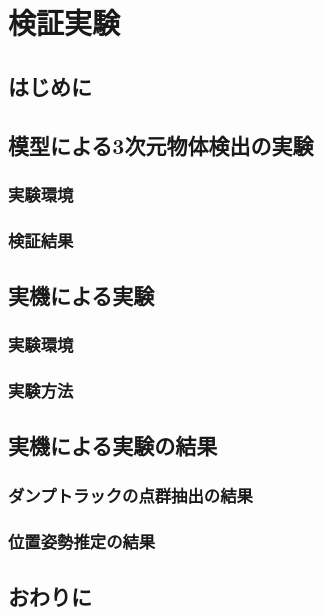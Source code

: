 \chapter{検証実験}
\thispagestyle{empty}
\label{chap3}
\minitoc

\newpage
\section{はじめに}
\section{模型による3次元物体検出の実験}
\subsection{実験環境}
\subsection{検証結果}
\section{実機による実験}
\subsection{実験環境}
\subsection{実験方法}
\section{実機による実験の結果}
\subsection{ダンプトラックの点群抽出の結果}
\subsection{位置姿勢推定の結果}
\section{おわりに}
